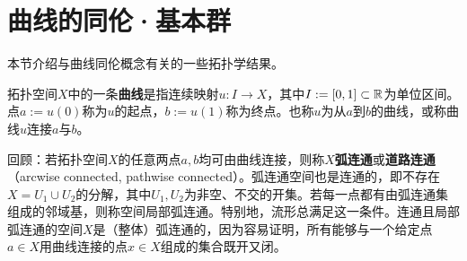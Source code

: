 \section{曲线的同伦·基本群}
本节介绍与曲线同伦概念有关的一些拓扑学结果。

拓扑空间$X$中的一条\textbf{曲线}是指连续映射$u:I\to X$，其中$I:=[0,1]\subset\mathbb R$为单位区间。点$a:=u(0)$称为$u$的起点，$b:=u(1)$称为终点。也称$u$为从$a$到$b$的曲线，或称曲线$u$连接$a$与$b$。

回顾：若拓扑空间$X$的任意两点$a,b$均可由曲线连接，则称$X$\textbf{弧连通}或\textbf{道路连通}（arcwise connected, pathwise connected）。弧连通空间也是连通的，即不存在$X=U_1\cup U_2$的分解，其中$U_1,U_2$为非空、不交的开集。若每一点都有由弧连通集组成的邻域基，则称空间局部弧连通。特别地，流形总满足这一条件。连通且局部弧连通的空间$X$是（整体）弧连通的，因为容易证明，所有能够与一个给定点$a\in X$用曲线连接的点$x\in X$组成的集合既开又闭。

